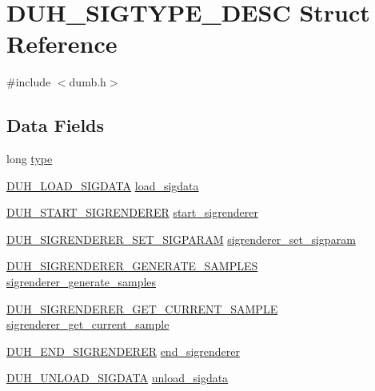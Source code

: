 \hypertarget{struct_d_u_h___s_i_g_t_y_p_e___d_e_s_c}{}\section{D\+U\+H\+\_\+\+S\+I\+G\+T\+Y\+P\+E\+\_\+\+D\+E\+SC Struct Reference}
\label{struct_d_u_h___s_i_g_t_y_p_e___d_e_s_c}


{\ttfamily \#include $<$dumb.\+h$>$}

\subsection*{Data Fields}
\begin{DoxyCompactItemize}
\item 
long \hyperlink{struct_d_u_h___s_i_g_t_y_p_e___d_e_s_c_abc96f94583aee502b6039ca194cd700a}{type}
\item 
\hyperlink{dumb_8h_a3818c5eff7c81e2bef088d8e20b202ba}{D\+U\+H\+\_\+\+L\+O\+A\+D\+\_\+\+S\+I\+G\+D\+A\+TA} \hyperlink{struct_d_u_h___s_i_g_t_y_p_e___d_e_s_c_aea5951b4ed5f352e3991b3ec4a0ed4ab}{load\+\_\+sigdata}
\item 
\hyperlink{dumb_8h_a371d3a257bdd31cd63b90c185c5d0483}{D\+U\+H\+\_\+\+S\+T\+A\+R\+T\+\_\+\+S\+I\+G\+R\+E\+N\+D\+E\+R\+ER} \hyperlink{struct_d_u_h___s_i_g_t_y_p_e___d_e_s_c_a1611ff6c1d6641e54a9d63173d824ea3}{start\+\_\+sigrenderer}
\item 
\hyperlink{dumb_8h_abf6cbd0addbb8af2b96b4f38a34174a5}{D\+U\+H\+\_\+\+S\+I\+G\+R\+E\+N\+D\+E\+R\+E\+R\+\_\+\+S\+E\+T\+\_\+\+S\+I\+G\+P\+A\+R\+AM} \hyperlink{struct_d_u_h___s_i_g_t_y_p_e___d_e_s_c_aa99084a37253e68bec09575f2c597a66}{sigrenderer\+\_\+set\+\_\+sigparam}
\item 
\hyperlink{dumb_8h_a41c08c2ab9ce04c1dc73e47352251cce}{D\+U\+H\+\_\+\+S\+I\+G\+R\+E\+N\+D\+E\+R\+E\+R\+\_\+\+G\+E\+N\+E\+R\+A\+T\+E\+\_\+\+S\+A\+M\+P\+L\+ES} \hyperlink{struct_d_u_h___s_i_g_t_y_p_e___d_e_s_c_a64216b7e386388df8fa828325856867e}{sigrenderer\+\_\+generate\+\_\+samples}
\item 
\hyperlink{dumb_8h_a94a2eff56d0bbb8bd5bcf1350d17be33}{D\+U\+H\+\_\+\+S\+I\+G\+R\+E\+N\+D\+E\+R\+E\+R\+\_\+\+G\+E\+T\+\_\+\+C\+U\+R\+R\+E\+N\+T\+\_\+\+S\+A\+M\+P\+LE} \hyperlink{struct_d_u_h___s_i_g_t_y_p_e___d_e_s_c_af60216a46d724e2468a56d57325f3389}{sigrenderer\+\_\+get\+\_\+current\+\_\+sample}
\item 
\hyperlink{dumb_8h_afeb74f6a5cc33029e3a2d89e9f39d48e}{D\+U\+H\+\_\+\+E\+N\+D\+\_\+\+S\+I\+G\+R\+E\+N\+D\+E\+R\+ER} \hyperlink{struct_d_u_h___s_i_g_t_y_p_e___d_e_s_c_a6030cb6485961177e2b89c06c3e66816}{end\+\_\+sigrenderer}
\item 
\hyperlink{dumb_8h_a6455dc4bc4bcee3d3dd9036139828248}{D\+U\+H\+\_\+\+U\+N\+L\+O\+A\+D\+\_\+\+S\+I\+G\+D\+A\+TA} \hyperlink{struct_d_u_h___s_i_g_t_y_p_e___d_e_s_c_a98db33bbab5bc5900712d32ef0d83556}{unload\+\_\+sigdata}
\end{DoxyCompactItemize}


